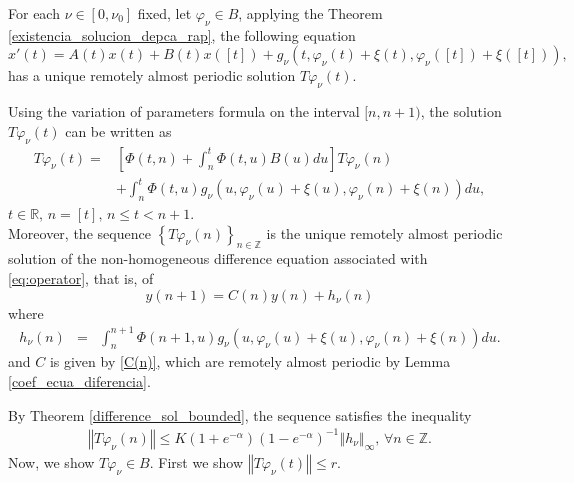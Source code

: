 \documentclass[english,,reqno]{amsart}
\numberwithin{equation}{section}
\theoremstyle{plain}
\theoremstyle{definition}
\theoremstyle{remark}
\begin{document}
For each $\nu\in\left[0,\nu_{0}\right]$ fixed, let $\varphi_{\nu}\in B$, applying the Theorem \ref{existencia_solucion_depca_rap}, the following equation
\begin{equation}
x'\left(t\right)=A\left(t\right)x\left(t\right)+B\left(t\right)x\left(\left[t\right]\right)+g_{\nu}\left(t,\varphi_{\nu}\left(t\right)+\xi\left(t\right),\varphi_{\nu}\left(\left[t\right]\right)+\xi\left(\left[t\right]\right)\right),\label{eq:operator}
\end{equation}
has a unique remotely almost periodic solution $T\varphi_{\nu}\left(t\right)$.

Using the variation of parameters formula on the interval $[n,n+1)$, the solution $T\varphi_{\nu}(t)$ can be written as
\begin{equation}
  \begin{aligned}
T\varphi_{\nu}\left(t\right)  = & \left[\Phi\left(t,n\right)+\int_{n}^{t}\Phi\left(t,u\right)B\left(u\right)du\right]T\varphi_{\nu}\left(n\right) \\
  & + \int_{n}^{t}\Phi\left(t,u\right)g_{\nu}\left(u,\varphi_{\nu}\left(u\right)+\xi\left(u\right),\varphi_{\nu}\left(n\right)+\xi\left(n\right)\right)du,\label{operadoooor}
\end{aligned}
\end{equation}
$t\in\mathbb{R},\, n=\left[t\right],\, n\leq t< n+1.$\\
Moreover, the sequence $\left\{ T\varphi_{\nu}(n) \right\}_{n \in \mathbb{Z}}$ is the unique remotely almost periodic solution of the non-homogeneous difference equation associated with \eqref{eq:operator}, that is, of
\begin{equation*}
y\left(n+1\right)=C\left(n\right)y\left(n\right)+ h_{\nu}\left(n\right)\label{eq:difference.equationsistem}
\end{equation*}
where
\begin{eqnarray*}
h_{\nu}\left(n\right) & = & \int_{n}^{n+1}\Phi\left(n+1,u\right)g_{\nu}\left(u,\varphi_{\nu}\left(u\right)+\xi\left(u\right),\varphi_{\nu}\left(n\right)+\xi\left(n\right)\right)du.
\end{eqnarray*}
and $C$ is given by \eqref{C(n)}, which are remotely almost periodic by Lemma \ref{coef_ecua_diferencia}.

By Theorem \ref{difference_sol_bounded}, the sequence satisfies the inequality
\begin{eqnarray}
\left\Vert T\varphi_{\nu}\left(n\right)\right\Vert \leq K\left(1+e^{-\alpha}\right)\left(1-e^{-\alpha}\right)^{-1}\left\Vert h_{\nu}\right\Vert_{\infty},\,\forall n\in\mathbb{Z}.\label{cota_sucesion}
\end{eqnarray}
Now, we show $T\varphi_{\nu}\in B$. First we show $\left\Vert T\varphi_{\nu}\left(t\right)\right\Vert \leq r.$
\end{document}
